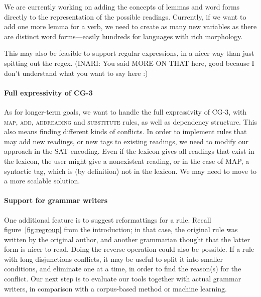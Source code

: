 We are currently working on adding the concepts of lemmas and word
forms directly to the representation of the possible readings.
Currently, if we want to add one more lemma for a verb, we need to
create as many new variables as there are distinct word forms---easily
hundreds for languages with rich morphology. 

This may also be feasible to support regular expressions, in a nicer
way than just spitting out the regex. (INARI: You said MORE ON THAT here, good because I don't understand what you want to say here :)

\paragraph{Full expressivity of CG-3}
As for longer-term goals, we want to handle the full expressivity of CG-3,
with \textsc{map}, \textsc{add},  \textsc{addreading} and
\textsc{substitute} rules, as well as dependency structure. 
This also means finding different kinds of conflicts.
In order to implement rules that may add new readings, or new tags to
existing readings, we need to modify our approach in the SAT-encoding.
Even if the lexicon gives all readings that exist in the lexicon, the
user might give a nonexistent reading, or in the case of MAP, a
syntactic tag, which is (by definition) not in the lexicon. We may need to move
to a more scalable solution.



\paragraph{Support for grammar writers}
One additional feature is to suggest reformattings for a rule. Recall
figure~\ref{fig:regroup} from the introduction; in that case, the
original rule was written by the original author, and another
grammarian thought that the latter form is nicer to read. Doing the
reverse operation could also be possible. If a rule with long
disjunctions conflicts, it may be useful to split it into smaller
conditions, and eliminate one at a time, in order to find the
reason(s) for the conflict.
Our next step is to evaluate our tools together with actual grammar writers,
in comparison with a corpus-based method or machine learning.

